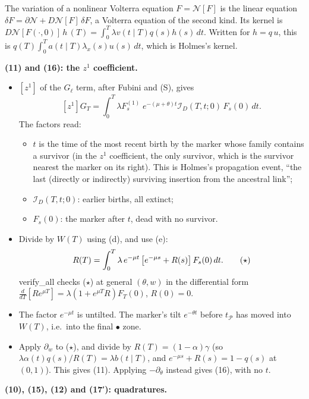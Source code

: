 \documentclass[10pt,]{article}
\providecommand{\tightlist}{%
  \setlength{\itemsep}{0pt}\setlength{\parskip}{0pt}}
\begin{document}
The variation of a nonlinear Volterra equation \(F=\mathcal N[F]\) is
the linear equation
\(\delta F=\partial\mathcal N+D\mathcal N[F]\,\delta F\), a Volterra
equation of the second kind. Its kernel is
\(D\mathcal N[F(\cdot,0)]\,h\,(T)=\int_0^T\lambda v(t\mid T)q(s)h(s)\,dt\).
Written for \(h=q\,u\), this is
\(q(T)\int_0^Ta(t\mid T)\lambda_x(s)u(s)\,dt\), which is Holmes's
kernel.

\textbf{(11) and (16): the \(z^1\) coefficient.}

\begin{itemize}
\tightlist
\item
  \([z^1]\) of the \(G_\ell\) term, after Fubini and (S), gives
  \[[z^1]G_T=\int_0^T\lambda F^{(1)}_{s}\;e^{-(\mu+\theta)t}\mathcal I_D(T,t;0)\,F_{s}(0)\,dt .\]
  The factors read:

  \begin{itemize}
  \tightlist
  \item
    \(t\) is the time of the most recent birth by the marker whose
    family contains a survivor (in the \(z^1\) coefficient, the only
    survivor, which is the survivor nearest the marker on its right).
    This is Holmes's propagation event, ``the last (directly or
    indirectly) surviving insertion from the ancestral link'';
  \item
    \(\mathcal I_D(T,t;0)\): earlier births, all extinct;
  \item
    \(F_s(0)\): the marker after \(t\), dead with no survivor.
  \end{itemize}
\item
  Divide by \(W(T)\) using (d), and use (e):
  \[R(T)=\int_0^T\lambda\,e^{-\mu t}\,\big[e^{-\mu s}+R(s)\big]\,F_s(0)\,dt .\tag{\ensuremath{\star}}\]
  verify\_all checks (\(\star\)) at general \((\theta,w)\) in the
  differential form
  \(\frac{d}{dT}[Re^{\mu T}]=\lambda(1+e^{\mu T}R)F_T(0)\), \(R(0)=0\).
\item
  The factor \(e^{-\mu t}\) is untilted. The marker's tilt
  \(e^{-\theta t}\) before \(t_{\mathcal P}\) has moved into \(W(T)\),
  i.e.~into the final \(\bullet\) zone.
\item
  Apply \(\partial_w\) to (\(\star\)), and divide by
  \(R(T)=(1-\alpha)\gamma\) (so
  \(\lambda\alpha(t)q(s)/R(T)=\lambda b(t\mid T)\), and
  \(e^{-\mu s}+R(s)=1-q(s)\) at \((0,1)\)). This gives (11). Applying
  \(-\partial_\theta\) instead gives (16), with no \(t\).
\end{itemize}

\textbf{(10), (15), (12) and (17′): quadratures.}
\end{document}
